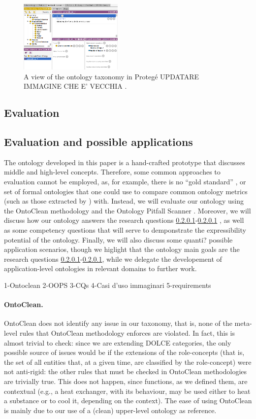 \documentclass[sw]{iosart2x}
\newcommand{\DOLCE}{\textsc{DOLCE}\xspace} %
\newcommand{\qquotes}[1]{``#1''}
\newcommand{\TODO}[1]{{\color{red} #1
}}
\begin{document}
\begin{figure}
  \centering
  \includegraphics[width=0.45\textwidth]{entities_screenshot.PNG}
  \caption{A view of the ontology taxonomy in Protegé\TODO{UPDATARE IMMAGINE CHE E' VECCHIA}.\label{fig:screen_entities}}
\end{figure}

\subsection{Evaluation}
\subsection{Evaluation and possible applications}
The ontology developed in this paper is a hand-crafted prototype that discusses middle and high-level concepts. 
Therefore, some common approaches to evaluation cannot be employed, as, for example, there is no \qquotes{gold standard} \cite{}, or set of formal ontologies that one could use to compare common ontology metrics (such as those extracted by \cite{}) with.
Instead, we will evaluate our ontology using the OntoClean methodology  \cite{guarinoOverviewOntoClean2009} and the Ontology Pitfall Scanner \cite{poveda2014oops}. 
Moreover, we will discuss how our ontology answers the research questions \TODO{\ref{}-\ref{}}, as well as some competency questions that will serve to demponstrate the expressibility potential of the ontology.
Finally, we will also discuss some\TODO{quanti?} possible application scenarios, though we higlight that the ontology main goals are the research questions \ref{}-\ref{}, while we delegate the developement of application-level ontologies in relevant domains to further work.

\TODO{
1-Ontoclean
2-OOPS
3-CQs
4-Casi d'uso immaginari
5-requirements}

\paragraph{OntoClean.} OntoClean does not identify any issue in our taxonomy, that is, none of the meta-level rules that OntoClean methodology enforces are violated.
In fact, this is almost trivial to check: since we are extending \DOLCE categories, the only possible source of issues would be if the extensions of the role-concepts (that is, the set of all entities that, at a given time, are classified by the role-concept) were not anti-rigid: the other rules that must be checked in OntoClean methodologies are trivially true. 
This does not happen, since functions, as we defined them, are contextual (e.g., a heat exchanger, with its behaviour, may be used either to heat a substance or to cool it, depending on the context). 
The ease of using OntoClean is mainly due to our use of a (clean) upper-level ontology as reference. 
\end{document}
